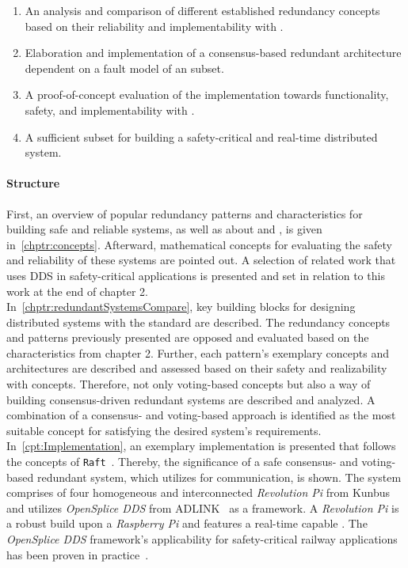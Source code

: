 \begin{enumerate}
\item An analysis and comparison of different established redundancy concepts based on their reliability and implementability with .
\item Elaboration and implementation of a consensus-based redundant architecture dependent on a fault model of an  subset.
\item A proof-of-concept evaluation of the implementation towards functionality, safety, and implementability with .
\item A sufficient  subset for building a safety-critical and real-time distributed system.
\end{enumerate}

\paragraph{Structure}
First, an overview of popular redundancy patterns and characteristics for building safe and reliable systems, as well as about  and , is given in~\autoref{chptr:concepts}.
Afterward, mathematical concepts for evaluating the safety and reliability of these systems are pointed out.
A selection of related work that uses \gls{DDS} in safety-critical applications is presented and set in relation to this work at the end of chapter 2.
\\

In~\autoref{chptr:redundantSystemsCompare}, key building blocks for designing distributed systems with the  standard are described.
The redundancy concepts and patterns previously presented are opposed and evaluated based on the characteristics from chapter 2.
Further, each pattern's exemplary concepts and architectures are described and assessed based on their safety and realizability with  concepts.
Therefore, not only voting-based concepts but also a way of building consensus-driven redundant systems are described and analyzed.
A combination of a consensus- and voting-based approach is identified as the most suitable concept for satisfying the desired system's requirements.
\\

In~\autoref{cpt:Implementation}, an exemplary implementation is presented that follows the concepts of \texttt{Raft}~\cite{RaftConsensusPaper}.
Thereby, the significance of a safe consensus- and voting-based redundant system, which utilizes  for communication, is shown.
The system comprises of four homogeneous and interconnected \textit{Revolution Pi} from Kunbus~\cite{Kunbus} and utilizes \textit{OpenSplice DDS} from ADLINK~\cite{VortexOpenSplice} as a  framework.
A \textit{Revolution Pi} is a robust  build upon a \textit{Raspberry Pi} and features a real-time capable .
The \textit{OpenSplice DDS} framework's applicability for safety-critical railway applications has been proven in practice~\cite{SchmidtMissionCriticalChallenges}.
\\

